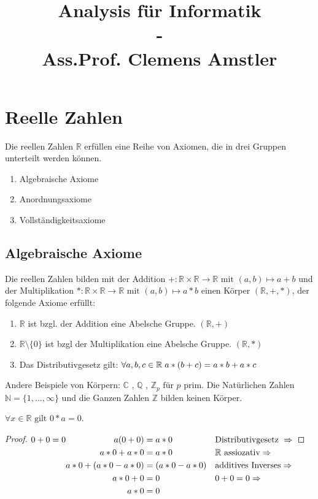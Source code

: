 \documentclass[a4paper,titlepage,oneside]{article}
\title{Analysis für Informatik\small{ \\ - \\ Ass.Prof. Clemens Amstler}}
\def\C{\ensuremath{\mathbb{C}} }
\def\N{\ensuremath{\mathbb{N}} }
\def\Q{\ensuremath{\mathbb{Q}} }
\def\Z{\ensuremath{\mathbb{Z}} }
\def\R{\ensuremath{\mathbb{R}} }
\def\fa{\ensuremath{\forall}}
\def\sp{\hspace{0,1cm}}
\theoremstyle{thmstyle}
\begin{document}
\onehalfspace

\maketitle

\tableofcontents 
\newpage

\section{Reelle Zahlen}
Die reellen Zahlen \R erfüllen eine Reihe von Axiomen, die in drei Gruppen unterteilt werden können.

\begin{enumerate}[label=\Roman*.]
	\item Algebraische Axiome
	\item Anordnungsaxiome
	\item Vollständigkeitsaxiome
\end{enumerate}

\subsection{Algebraische Axiome}
Die reellen Zahlen bilden mit der Addition \( + : \R \times \R \to \R \text{ mit } (a,b) \mapsto a + b\) und der Multiplikation \( * :  \R \times \R \to \R \text{ mit } (a,b) \mapsto a * b \)
einen Körper \((\R, +, * )\), der folgende Axiome erfüllt:
\begin{enumerate}[label=\arabic*)]
	\item \(\R\) ist bzgl. der Addition eine Abelsche Gruppe. \((\R,+)\)
	\item \(\R \setminus \{0\}\) ist bzgl der Multiplikation eine Abelsche Gruppe. \((\R,*)\)
	\item Das Distributivgesetz gilt: \( \fa a,b,c \in \R \sp a * (b + c) = a * b + a * c\)
\end{enumerate}
Andere Beispiele von Körpern: \C, \Q, \(\Z_p \text{ für }p\) prim.
Die Natürlichen Zahlen \(\N = \{1,\dots,\infty \} \) und die Ganzen Zahlen \Z bilden keinen Körper.

\begin{subprop}
\(\fa x \in \R \text{ gilt } 0 * a = 0\).
\begin{proof}
\begin{math}
0+0 = 0 \begin{aligned}[t] a ( 0 + 0 ) &= a * 0 					&&\text{Distributivgesetz } \Rightarrow \\
					a * 0 + a * 0 &= a * 0 				&&\text{\R assiozativ} \Rightarrow\\
					a * 0 + (a * 0 - a * 0) &= (a * 0 - a * 0) 	&& \text{additives Inverses} \Rightarrow\\
					a * 0 +  0 &= 0	 					&& 0+0 = 0 \Rightarrow\\
					a * 0 &= 0 \end{aligned}\\
\end{math}
\end{proof}
\end{subprop}
\end{document}

